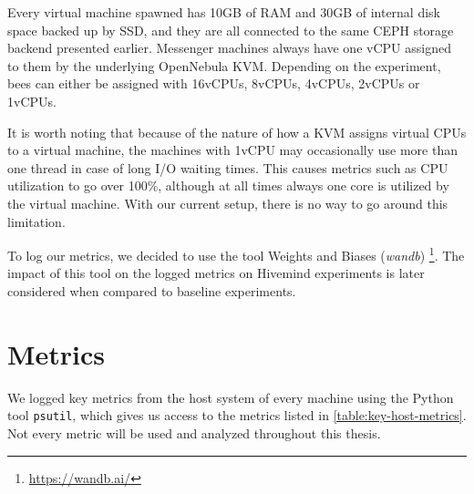 Every virtual machine spawned has 10GB of RAM and 30GB of internal disk space backed up by SSD, and they are all connected to the same CEPH storage backend presented earlier.
Messenger machines always have one vCPU assigned to them by the underlying OpenNebula KVM.
Depending on the experiment, bees can either be assigned with 16vCPUs, 8vCPUs, 4vCPUs, 2vCPUs or 1vCPUs.

It is worth noting that because of the nature of how a KVM assigns virtual CPUs to a virtual machine, the machines with 1vCPU may occasionally use more than one thread in case of long I/O waiting times.
This causes metrics such as CPU utilization to go over 100\%, although at all times always one core is utilized by the virtual machine.
With our current setup, there is no way to go around this limitation.

To log our metrics, we decided to use the tool Weights and Biases (\textit{wandb}) \footnote{\href{https://wandb.ai/}{https://wandb.ai/}}.
The impact of this tool on the logged metrics on Hivemind experiments is later considered when compared to baseline experiments.

\section{Metrics}
We logged key metrics from the host system of every machine using the Python tool \texttt{psutil}, which gives us access to the metrics listed in \autoref{table:key-host-metrics}.
Not every metric will be used and analyzed throughout this thesis.

